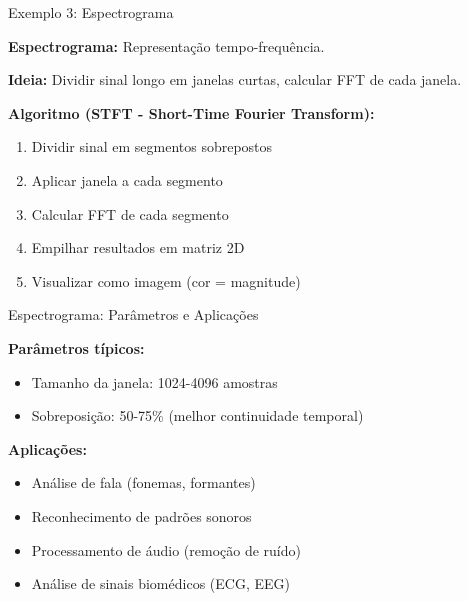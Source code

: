 
\begin{frame}{Exemplo 3: Espectrograma}

\textbf{Espectrograma:} Representação tempo-frequência.

\textbf{Ideia:} Dividir sinal longo em janelas curtas, calcular FFT de cada janela.

\textbf{Algoritmo (STFT - Short-Time Fourier Transform):}

\begin{enumerate}
\item Dividir sinal em segmentos sobrepostos
\item Aplicar janela a cada segmento
\item Calcular FFT de cada segmento
\item Empilhar resultados em matriz 2D
\item Visualizar como imagem (cor = magnitude)
\end{enumerate}

\end{frame}


\begin{frame}{Espectrograma: Parâmetros e Aplicações}

\textbf{Parâmetros típicos:}

\begin{itemize}
\item Tamanho da janela: 1024-4096 amostras
\item Sobreposição: 50-75\% (melhor continuidade temporal)
\end{itemize}

\textbf{Aplicações:}

\begin{itemize}
\item Análise de fala (fonemas, formantes)
\item Reconhecimento de padrões sonoros
\item Processamento de áudio (remoção de ruído)
\item Análise de sinais biomédicos (ECG, EEG)
\end{itemize}

\end{frame}


